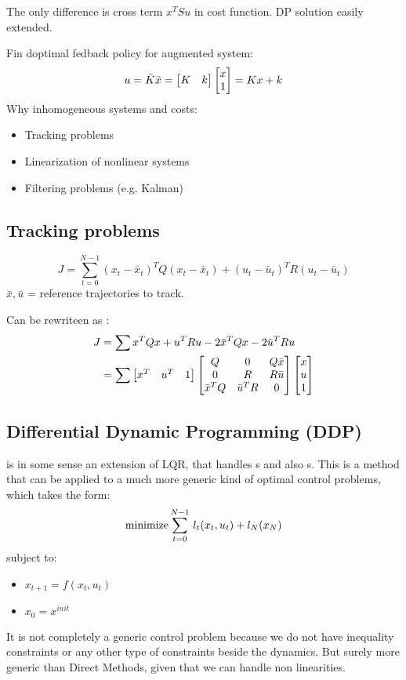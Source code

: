 The only difference is cross term $x^TSu$ in cost function.
DP solution easily extended.

Fin doptimal fedback policy for augmented system:
\[u=\bar{K}\bar{x} = \begin{bmatrix}K&k\end{bmatrix}\begin{bmatrix}x\\1\end{bmatrix} = Kx+k\]
Why inhomogeneous systems and costs:
\begin{itemize}
\item Tracking problems
\item Linearization of nonlinear systems
\item Filtering problems (e.g. Kalman)
\end{itemize}

\subsection{Tracking problems}
\[J = \sum_{t=0}^{N-1} (x_t-\bar{x}_t)^TQ(x_t-\bar{x}_t) + (u_t-\bar{u}_t)^TR(u_t-\bar{u}_t)\]
$\bar{x}, \bar{u}$ = reference trajectories to track.

Can be rewriteen as :
\begin{align*}
J&=\sum x^TQx + u^TRu - 2\bar{x}^TQx - 2\bar{u}^TRu\\
&=\sum \begin{bmatrix}x^T&u^T&1\end{bmatrix}\begin{bmatrix}Q&0&Q\bar{x}\\0&R&R\bar{u}\\\bar{x}^TQ&\bar{u}^TR&0\end{bmatrix}\begin{bmatrix}x\\u\\1\end{bmatrix}
\end{align*}

\subsection{Differential Dynamic Programming (DDP)}
 is in some sense an extension of LQR, that handles s and also s.
This is a method that can be applied to a much more generic kind of optimal control problems, which takes the form:
\[\operatorname*{minimize} \sum_{t=0}^{N-1}\,l_t(x_t, u_t) + l_N(x_N)\]
subject to:
\begin{itemize}
\item $x_{t+1} = f(x_t, u_t)$
\item $x_0 = x^{init}$
\end{itemize}
It is not completely a generic control problem because we do not have inequality constraints or any other type of constraints beside the dynamics. But surely more generic than Direct Methods, given that we can handle non linearities.

